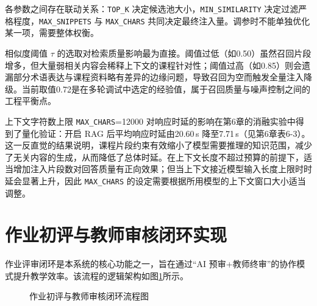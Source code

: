 \documentclass[12pt,a4paper,oneside]{ctexbook}
\numberwithin{equation}{chapter}
\begin{document}
各参数之间存在联动关系：\texttt{TOP\_K} 决定候选池大小，\texttt{MIN\_SIMILARITY} 决定过滤严格程度，\texttt{MAX\_SNIPPETS} 与 \texttt{MAX\_CHARS} 共同决定最终注入量。调参时不能单独优化某一项，需要整体权衡。

相似度阈值 $\tau$ 的选取对检索质量影响最为直接。阈值过低（如0.50）虽然召回片段增多，但大量弱相关内容会稀释上下文的课程针对性；阈值过高（如0.85）则会遗漏部分术语表达与课程资料略有差异的边缘问题，导致召回为空而触发全量注入降级。当前取值0.72是在多轮调试中选定的经验值，属于召回质量与噪声控制之间的工程平衡点。

上下文字符数上限 \texttt{MAX\_CHARS}=12000 对响应时延的影响在第6章的消融实验中得到了量化验证：开启 RAG 后平均响应时延由20.60\,s 降至7.71\,s（见第6章表6-3）。这一反直觉的结果说明，课程片段约束有效缩小了模型需要推理的知识范围，减少了无关内容的生成，从而降低了总体时延。在上下文长度不超过预算的前提下，适当增加注入片段数对回答质量有正向效果；但当上下文接近模型输入长度上限时时延会显著上升，因此 \texttt{MAX\_CHARS} 的设定需要根据所用模型的上下文窗口大小适当调整。

\section{作业初评与教师审核闭环实现}
作业评审闭环是本系统的核心功能之一，旨在通过“AI 预审+教师终审”的协作模式提升教学效率。该流程的逻辑架构如图\ref{fig:reviewFlow}所示。

\begin{figure}[H]
  \centering
  \caption{作业初评与教师审核闭环流程图}
  \label{fig:reviewFlow}
\end{figure}
\end{document}
